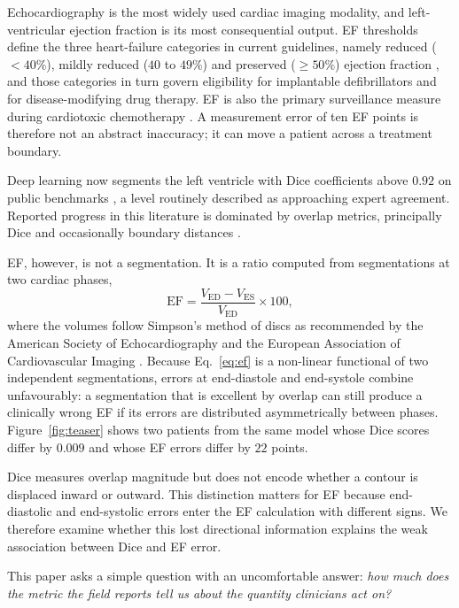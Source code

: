 \documentclass[conference,a4paper]{IEEEtran}
\begin{document}
Echocardiography is the most widely used cardiac imaging modality, and left-ventricular
ejection fraction is its most consequential output. EF thresholds define the three
heart-failure categories in current guidelines, namely reduced ($<40\%$), mildly reduced
($40$ to $49\%$) and preserved ($\geq 50\%$) ejection fraction \cite{mcdonagh2021}, and
those categories in turn govern eligibility for implantable defibrillators and for
disease-modifying drug therapy. EF is also the primary surveillance measure during
cardiotoxic chemotherapy \cite{thavendiranathan2013}. A measurement error of ten EF points
is therefore not an abstract inaccuracy; it can move a patient across a treatment boundary.

Deep learning now segments the left ventricle with Dice coefficients above $0.92$ on public
benchmarks \cite{leclerc2019,ouyang2020,isensee2021}, a level routinely described as
approaching expert agreement. Reported progress in this literature is dominated by overlap
metrics, principally Dice \cite{dice1945,milletari2016} and occasionally boundary distances
\cite{taha2015}.

EF, however, is not a segmentation. It is a ratio computed from segmentations at two
cardiac phases,
\begin{equation}
\mathrm{EF} = \frac{V_{\mathrm{ED}} - V_{\mathrm{ES}}}{V_{\mathrm{ED}}} \times 100 ,
\label{eq:ef}
\end{equation}
where the volumes follow Simpson's method of discs as recommended by the American Society
of Echocardiography and the European Association of Cardiovascular Imaging
\cite{lang2015}. Because Eq.~\eqref{eq:ef} is a non-linear functional of two independent
segmentations, errors at end-diastole and end-systole combine unfavourably: a
segmentation that is excellent by overlap can still produce a clinically wrong EF if its
errors are distributed asymmetrically between phases. Figure~\ref{fig:teaser} shows two
patients from the same model whose Dice scores differ by $0.009$ and whose EF errors differ
by $22$ points.

Dice measures overlap magnitude but does not encode whether a contour is displaced inward
or outward. This distinction matters for EF because end-diastolic and end-systolic errors
enter the EF calculation with different signs. We therefore examine whether this lost
directional information explains the weak association between Dice and EF error.

This paper asks a simple question with an uncomfortable answer: \emph{how much does the
metric the field reports tell us about the quantity clinicians act on?}
\end{document}
